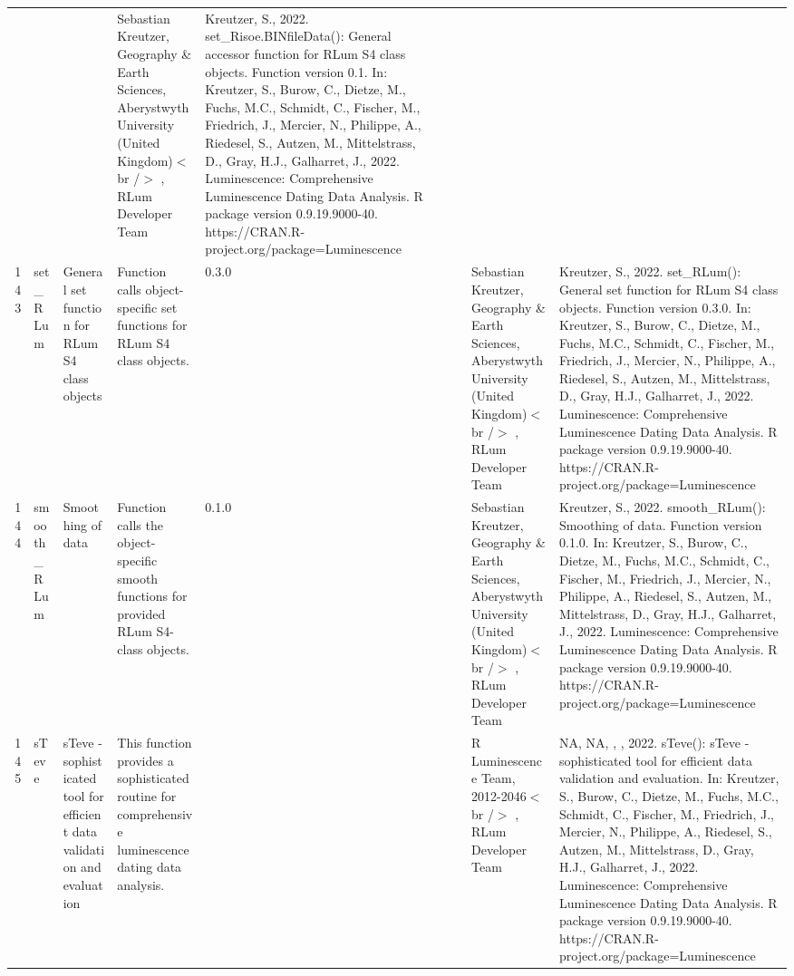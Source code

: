 \begin{table}[ht]
\begin{tabular}{rllllllll}
 &  &  & Sebastian Kreutzer, Geography \& Earth Sciences, Aberystwyth University (United Kingdom)$<$br /$>$ , RLum Developer Team & Kreutzer, S., 2022. set\_Risoe.BINfileData(): General accessor function for RLum S4 class objects. Function version 0.1. In: Kreutzer, S., Burow, C., Dietze, M., Fuchs, M.C., Schmidt, C., Fischer, M., Friedrich, J., Mercier, N., Philippe, A., Riedesel, S., Autzen, M., Mittelstrass, D., Gray, H.J., Galharret, J., 2022. Luminescence: Comprehensive Luminescence Dating Data Analysis. R package version 0.9.19.9000-40. https://CRAN.R-project.org/package=Luminescence
 \\ 
  143 & set\_RLum & General set function for RLum S4 class objects & Function calls object-specific set functions for RLum S4 class objects. & 0.3.0
 &  &  & Sebastian Kreutzer, Geography \& Earth Sciences, Aberystwyth University (United Kingdom)$<$br /$>$ , RLum Developer Team & Kreutzer, S., 2022. set\_RLum(): General set function for RLum S4 class objects. Function version 0.3.0. In: Kreutzer, S., Burow, C., Dietze, M., Fuchs, M.C., Schmidt, C., Fischer, M., Friedrich, J., Mercier, N., Philippe, A., Riedesel, S., Autzen, M., Mittelstrass, D., Gray, H.J., Galharret, J., 2022. Luminescence: Comprehensive Luminescence Dating Data Analysis. R package version 0.9.19.9000-40. https://CRAN.R-project.org/package=Luminescence
 \\ 
  144 & smooth\_RLum & Smoothing of data & Function calls the object-specific smooth functions for provided RLum S4-class objects. & 0.1.0
 &  &  & Sebastian Kreutzer, Geography \& Earth Sciences, Aberystwyth University (United Kingdom)$<$br /$>$ , RLum Developer Team & Kreutzer, S., 2022. smooth\_RLum(): Smoothing of data. Function version 0.1.0. In: Kreutzer, S., Burow, C., Dietze, M., Fuchs, M.C., Schmidt, C., Fischer, M., Friedrich, J., Mercier, N., Philippe, A., Riedesel, S., Autzen, M., Mittelstrass, D., Gray, H.J., Galharret, J., 2022. Luminescence: Comprehensive Luminescence Dating Data Analysis. R package version 0.9.19.9000-40. https://CRAN.R-project.org/package=Luminescence
 \\ 
  145 & sTeve & sTeve - sophisticated tool for efficient data validation and evaluation & This function provides a sophisticated routine for comprehensive luminescence dating data analysis. &  &  &  & R Luminescence Team, 2012-2046$<$br /$>$ , RLum Developer Team & NA, NA, , , 2022. sTeve(): sTeve - sophisticated tool for efficient data validation and evaluation. In: Kreutzer, S., Burow, C., Dietze, M., Fuchs, M.C., Schmidt, C., Fischer, M., Friedrich, J., Mercier, N., Philippe, A., Riedesel, S., Autzen, M., Mittelstrass, D., Gray, H.J., Galharret, J., 2022. Luminescence: Comprehensive Luminescence Dating Data Analysis. R package version 0.9.19.9000-40. https://CRAN.R-project.org/package=Luminescence

\end{tabular}
\end{table}
